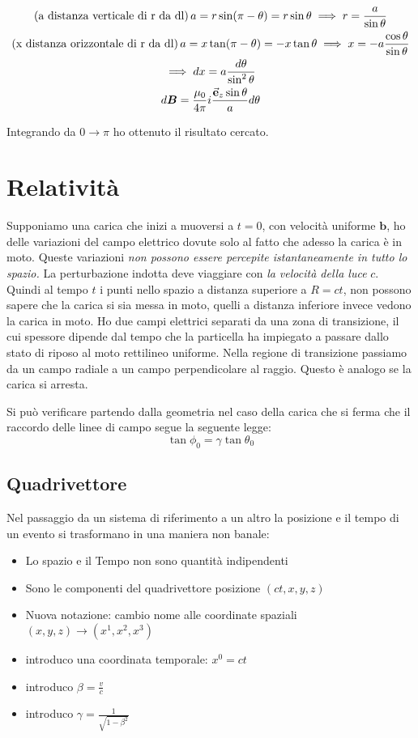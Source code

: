 \documentclass[a4paper]{scrarticle}
\begin{document}
\begin{gather*}
    (\text{a distanza verticale di r da dl})\, a = r \sin(\pi - \theta) = r \sin \theta \implies r = \frac{a}{\sin \theta}\\
    (\text{x distanza orizzontale di r da dl})\, a= x \tan (\pi -\theta) = -x \tan \theta \implies x = -a \frac{\cos \theta}{\sin \theta}\\
    \implies dx = a \frac{d \theta}{\sin^2 \theta}\\
    d \bm B = \frac{\mu_0}{4\pi}i \frac{\va e_z \sin \theta}{a}d\theta
\end{gather*}

Integrando da $0 \to \pi$ ho ottenuto il risultato cercato.

\section{Relatività}

Supponiamo una carica che inizi a muoversi a $t=0$, con velocità uniforme $\bm b$, ho delle variazioni del campo elettrico dovute solo al fatto che adesso la carica è in moto. Queste variazioni \emph{non possono essere percepite istantaneamente in tutto lo spazio.} La perturbazione indotta deve viaggiare con \emph{la velocità della luce} $c$.
Quindi al tempo $t$ i punti nello spazio a distanza superiore a  $R=ct$, non possono sapere che la carica si sia messa in moto, quelli a distanza inferiore invece vedono la carica in moto. Ho due campi elettrici separati da una zona di transizione, il cui spessore dipende dal tempo che la particella ha impiegato a passare dallo stato di riposo al moto rettilineo uniforme.
Nella regione di transizione passiamo da un campo radiale  a un campo perpendicolare al raggio. Questo è analogo se la carica si arresta.

Si può verificare partendo dalla geometria nel caso della carica che si ferma che il raccordo delle linee di campo segue la seguente legge:
\begin{equation*}
    \tan \phi_0 = \gamma \tan \theta_0
\end{equation*}

\subsection{Quadrivettore}

Nel passaggio da un sistema di riferimento a un altro la posizione e il tempo di un evento si trasformano in una maniera non banale:
\begin{itemize}
    \item Lo spazio e il Tempo non sono quantità indipendenti
    \item Sono le componenti del quadrivettore posizione $(ct,x,y,z)$
    \item Nuova notazione: cambio nome alle coordinate spaziali $(x,y,z) \to (x^1, x^2, x^3)$
    \item introduco una coordinata temporale: $x^0 = ct$
    \item introduco $\beta= \frac{v}{c}$
    \item introduco $\gamma = \frac{1}{\sqrt{1 - \beta^2}}$
\end{itemize}
\end{document}
